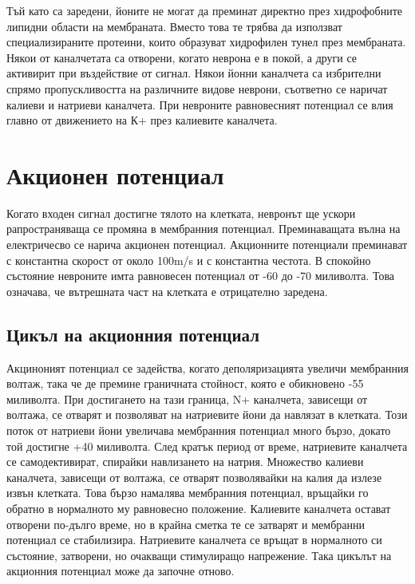 \documentclass{article}
\begin{document}
Тъй като са заредени, йоните не могат да преминат директно през хидрофобните липидни области на мембраната. Вместо това те трябва да използват специализираните протеини, които образуват хидрофилен тунел през мембраната. Някои от каналчетата са отворени, когато неврона е в покой, а други се активирит при въздействие от сигнал. Някои йонни каналчета са избрителни спрямо пропускливостта на различните видове неврони, съответно се наричат калиеви и натриеви каналчета. При невроните равновесният потенциал се влия главно от движението на К+ през калиевите каналчета.

\vspace{5mm} %


\section{Акционен потенциал}
Когато входен сигнал достигне тялото на клетката, невронът ще ускори рапространяваща се промяна в мембранния потенциал. Преминаващата вълна на електричесво се нарича акционен потенциал. Акционните потенциали преминават с константна скорост от около 100m/s и с константна честота. 
В спокойно състояние невроните имта равновесен потенциал от -60 до -70 миливолта. Това означава, че вътрешната част на клетката е отрицателно заредена.

\vspace{5mm} %
\subsection{Цикъл на акционния потенциал}

Акциноният потенциал се задейства, когато деполяризацията увеличи мембранния волтаж, така че де премине граничната стойност, която е обикновено -55 миливолта. При достигането на тази граница, N+ каналчета, зависещи от волтажа, се отварят и позволяват на натриевите йони да навлязат в клетката. Този поток от натриеви йони увеличава мембранния потенциал много бързо, докато той достигне +40 миливолта. След кратък период от време, натриевите каналчета се самодективират, спирайки навлизането на натрия. Множество калиеви каналчета, зависещи от волтажа, се отварят позволявайки на калия да излезе извън клетката. Това бързо намалява мембранния потенциал, връщайки го обратно в нормалното му равновесно положение. Калиевите каналчета остават отворени по-дълго време, но в крайна сметка те се затварят и мембранни потенциал се стабилизира. Натриевите каналчета се връщат в нормалното си състояние, затворени, но очакващи стимулиращо напрежение. Така цикълът на акционния потенциал може да започне отново.
\end{document}
